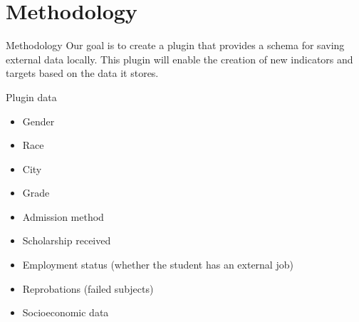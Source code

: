 \section{Methodology}

\begin{frame}{Methodology}
    Our goal is to create a plugin that provides a schema for saving external data locally. 
    This plugin will enable the creation of new indicators and targets based on the data it stores.
\end{frame}

\begin{frame}{Plugin data}
    \begin{itemize}[<+-|alert@+>]\color{gray}
        \item Gender
        \item Race
        \item City
        \item Grade
        \item Admission method
        \item Scholarship received
        \item Employment status (whether the student has an external job)
        \item Reprobations (failed subjects)
        \item Socioeconomic data
    \end{itemize}
\end{frame}


